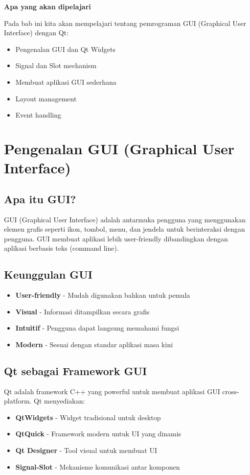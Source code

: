 \textbf{Apa yang akan dipelajari}

Pada bab ini kita akan mempelajari tentang pemrograman GUI (Graphical User Interface) dengan Qt:

\begin{itemize}
\item Pengenalan GUI dan Qt Widgets
\item Signal dan Slot mechanism
\item Membuat aplikasi GUI sederhana
\item Layout management
\item Event handling
\end{itemize}

\minitoc

\section{Pengenalan GUI (Graphical User Interface)}

\subsection{Apa itu GUI?}

GUI (Graphical User Interface) adalah antarmuka pengguna yang menggunakan elemen grafis seperti ikon, tombol, menu, dan jendela untuk berinteraksi dengan pengguna. GUI membuat aplikasi lebih user-friendly dibandingkan dengan aplikasi berbasis teks (command line).

\subsection{Keunggulan GUI}

\begin{itemize}
\item \textbf{User-friendly} - Mudah digunakan bahkan untuk pemula
\item \textbf{Visual} - Informasi ditampilkan secara grafis
\item \textbf{Intuitif} - Pengguna dapat langsung memahami fungsi
\item \textbf{Modern} - Sesuai dengan standar aplikasi masa kini
\end{itemize}

\subsection{Qt sebagai Framework GUI}

Qt adalah framework C++ yang powerful untuk membuat aplikasi GUI cross-platform. Qt menyediakan:
\begin{itemize}
\item \textbf{QtWidgets} - Widget tradisional untuk desktop
\item \textbf{QtQuick} - Framework modern untuk UI yang dinamis
\item \textbf{Qt Designer} - Tool visual untuk membuat UI
\item \textbf{Signal-Slot} - Mekanisme komunikasi antar komponen
\end{itemize}

